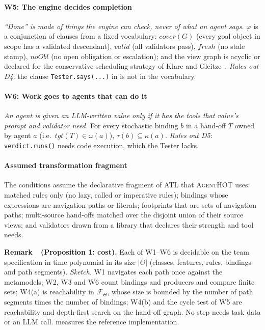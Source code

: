 \documentclass[10pt,a4paper]{article}
\newcommand{\tool}{\textsc{AgentHOT}}
\newcommand{\Team}{\Theta}
\newcommand{\W}[1]{\textsf{W#1}}
\newcommand{\D}[1]{\textsf{D#1}}
\newcommand{\code}[1]{\texttt{#1}}
\newcounter{remark}
\newenvironment{remark}[1][]{%
  \refstepcounter{remark}%
  \begin{tcolorbox}[enhanced, colback=accentlight, colframe=accentlight,
      borderline west={2.2pt}{0pt}{accent}, arc=0pt, boxrule=0pt,
      left=8pt, right=8pt, top=5pt, bottom=5pt, before skip=8pt, after skip=8pt]
  \textsf{\bfseries\color{accent}Remark~\theremark\if\relax\detokenize{#1}\relax\else\ (#1)\fi.}\enspace}%
  {\end{tcolorbox}}
\begin{document}
\paragraph{\W{5}: The engine decides completion} \emph{``Done'' is made of
things the engine can check, never of what an agent says.} $\varphi$ is a
conjunction of clauses from a fixed vocabulary: $\mathit{cover}(G)$ (every
goal object in scope has a validated descendant), $\mathit{valid}$ (all
validators pass), $\mathit{fresh}$ (no stale stamp), $\mathit{noObl}$ (no
open obligation or escalation); and the view graph is acyclic or declared
for the conservative scheduling strategy of Klare and
Gleitze~\cite{klare2023termination}. \emph{Rules out \D{4}}: the clause
\code{Tester.says(...)} in  is not in the vocabulary.

\paragraph{\W{6}: Work goes to agents that can do it} \emph{An agent is
given an LLM-written value only if it has the tools that value's prompt and
validator need.} For every stochastic binding $b$ in a hand-off $T$ owned
by agent $a$ (i.e.\ $\mathit{tgt}(T)\in\omega(a)$),
$\tau(b)\subseteq\kappa(a)$. \emph{Rules out \D{5}}: \code{verdict.runs()}
needs code execution, which the Tester lacks.

\paragraph{Assumed transformation fragment} The conditions assume
the declarative fragment of ATL that \tool{} uses: matched rules only (no
lazy, called or imperative rules); bindings whose expressions are
navigation paths or literals; footprints that are sets of navigation paths;
multi-source hand-offs matched over the disjoint union of their source
views; and validators drawn from a library that declares their strength and
tool needs.

\begin{remark}[Proposition 1: cost]
Each of \W{1}--\W{6} is decidable on the team specification in time
polynomial in its size $|\Team|$ (classes, features, rules, bindings and
path segments). \emph{Sketch.} \W{1} navigates each path once against the
metamodels; \W{2}, \W{3} and \W{6} count bindings and producers and compare
finite sets; \W{4}(a) is reachability in $\mathcal{F}_\Team$, whose size is
bounded by the number of path segments times the number of bindings;
\W{4}(b) and the cycle test of \W{5} are reachability and depth-first
search on the hand-off graph. No step needs task data or an LLM call.
 measures the reference implementation.
\end{remark}
\end{document}
